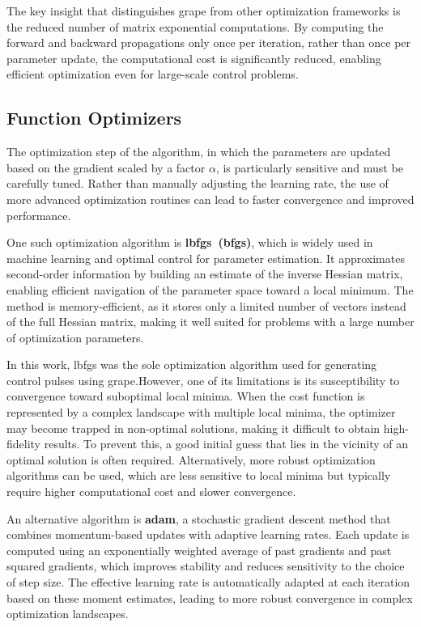 The key insight that distinguishes \acs{grape} from other optimization frameworks is the reduced number of matrix exponential computations. By computing the forward and backward propagations only once per iteration, rather than once per parameter update, the computational cost is significantly reduced, enabling efficient optimization even for large-scale control problems.

\subsection{Function Optimizers}
\label{optimizers}

The optimization step of the algorithm, in which the parameters are updated based on the gradient scaled by a factor \(\alpha\), is particularly sensitive and must be carefully tuned. Rather than manually adjusting the learning rate, the use of more advanced optimization routines can lead to faster convergence and improved performance.

One such optimization algorithm is \textbf{\acl{lbfgs}~(\acs{bfgs})}, which is widely used in machine learning and optimal control for parameter estimation. It approximates second-order information by building an estimate of the inverse Hessian matrix, enabling efficient navigation of the parameter space toward a local minimum. The method is memory-efficient, as it stores only a limited number of vectors instead of the full Hessian matrix, making it well suited for problems with a large number of optimization parameters.

In this work, \acs{lbfgs} was the sole optimization algorithm used for generating control pulses using \acs{grape}.\@ However, one of its limitations is its susceptibility to convergence toward suboptimal local minima. When the cost function is represented by a complex landscape with multiple local minima, the optimizer may become trapped in non-optimal solutions, making it difficult to obtain high-fidelity results. To prevent this, a good initial guess that lies in the vicinity of an optimal solution is often required. Alternatively, more robust optimization algorithms can be used, which are less sensitive to local minima but typically require higher computational cost and slower convergence.

An alternative algorithm is \textbf{\ac{adam}}, a stochastic gradient descent method that combines momentum-based updates with adaptive learning rates. Each update is computed using an exponentially weighted average of past gradients and past squared gradients, which improves stability and reduces sensitivity to the choice of step size. The effective learning rate is automatically adapted at each iteration based on these moment estimates, leading to more robust convergence in complex optimization landscapes.